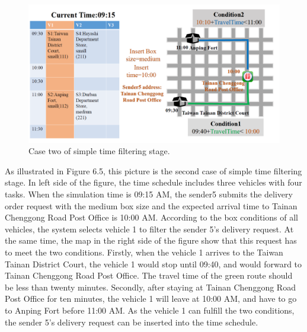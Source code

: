 \documentclass[12pt]{ksthesis}
\begin{document}
\begin{thesis}
{\begin{figure}[H]
\centering
\includegraphics[width=1.14\textwidth]{./Thesis_figures/F6-5_caseTwo_SchedulingStage.PNG}
\caption{\large Case two of simple time filtering stage.}
\vspace{0.5cm}
\label{Fig:CaseTwo_TimeFiltering}
\end{figure}

As illustrated in Figure 6.5, this picture is the second case of simple time filtering stage. In left side of the figure, the time schedule includes three vehicles with four tasks. When the simulation time is 09:15 AM, the sender5 submits the delivery order request with the medium box size and the expected arrival time to Tainan Chenggong Road Post Office is 10:00 AM.
According to the box conditions of all vehicles, the system selects vehicle 1 to filter the sender 5’s delivery request. At the same time, the map in the right side of the figure show that this request has to meet the two conditions. Firstly, when the vehicle 1 arrives to the Taiwan Tainan District Court, the vehicle 1 would stop until 09:40, and would forward to Tainan Chenggong Road Post Office. The travel time of the green route should be less than twenty minutes. Secondly, after staying at Tainan Chenggong Road Post Office for ten minutes, the vehicle 1 will leave at 10:00 AM, and have to go to Anping Fort before 11:00 AM. 
As the vehicle 1 can fulfill the two conditions, the sender 5’s delivery request can be inserted into the time schedule.




}
\end{thesis}
\end{document}
